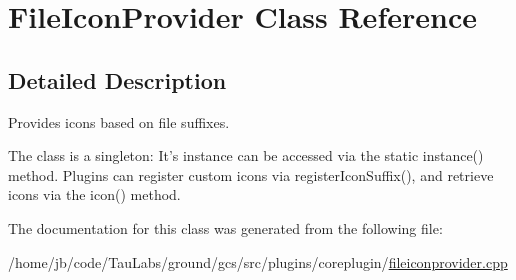 \hypertarget{class_file_icon_provider}{\section{\-File\-Icon\-Provider \-Class \-Reference}
\label{class_file_icon_provider}
}


\subsection{\-Detailed \-Description}
\-Provides icons based on file suffixes.

\-The class is a singleton\-: \-It's instance can be accessed via the static instance() method. \-Plugins can register custom icons via register\-Icon\-Suffix(), and retrieve icons via the icon() method. 

\-The documentation for this class was generated from the following file\-:\begin{DoxyCompactItemize}
\item 
/home/jb/code/\-Tau\-Labs/ground/gcs/src/plugins/coreplugin/\hyperlink{fileiconprovider_8cpp}{fileiconprovider.\-cpp}\end{DoxyCompactItemize}
